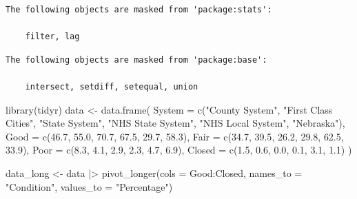 \documentclass[
  letterpaper,
  DIV=11,
  numbers=noendperiod]{scrreprt}
\newenvironment{Shaded}{\begin{snugshade}}{\end{snugshade}}
\newcommand{\AttributeTok}[1]{\textcolor[rgb]{0.40,0.45,0.13}{#1}}
\newcommand{\FloatTok}[1]{\textcolor[rgb]{0.68,0.00,0.00}{#1}}
\newcommand{\FunctionTok}[1]{\textcolor[rgb]{0.28,0.35,0.67}{#1}}
\newcommand{\NormalTok}[1]{\textcolor[rgb]{0.00,0.23,0.31}{#1}}
\newcommand{\OtherTok}[1]{\textcolor[rgb]{0.00,0.23,0.31}{#1}}
\newcommand{\SpecialCharTok}[1]{\textcolor[rgb]{0.37,0.37,0.37}{#1}}
\newcommand{\StringTok}[1]{\textcolor[rgb]{0.13,0.47,0.30}{#1}}
\begin{document}
\begin{verbatim}
The following objects are masked from 'package:stats':

    filter, lag
\end{verbatim}

\begin{verbatim}
The following objects are masked from 'package:base':

    intersect, setdiff, setequal, union
\end{verbatim}

\begin{Shaded}
\begin{Highlighting}[]
\FunctionTok{library}\NormalTok{(tidyr)}
\NormalTok{data }\OtherTok{\textless{}{-}} \FunctionTok{data.frame}\NormalTok{(}
  \AttributeTok{System =} \FunctionTok{c}\NormalTok{(}\StringTok{"County System"}\NormalTok{, }\StringTok{"First Class Cities"}\NormalTok{, }\StringTok{"State System"}\NormalTok{, }\StringTok{"NHS State System"}\NormalTok{, }
             \StringTok{"NHS Local System"}\NormalTok{, }\StringTok{"Nebraska"}\NormalTok{),}
  \AttributeTok{Good =} \FunctionTok{c}\NormalTok{(}\FloatTok{46.7}\NormalTok{, }\FloatTok{55.0}\NormalTok{, }\FloatTok{70.7}\NormalTok{, }\FloatTok{67.5}\NormalTok{, }\FloatTok{29.7}\NormalTok{, }\FloatTok{58.3}\NormalTok{),}
  \AttributeTok{Fair =} \FunctionTok{c}\NormalTok{(}\FloatTok{34.7}\NormalTok{, }\FloatTok{39.5}\NormalTok{, }\FloatTok{26.2}\NormalTok{, }\FloatTok{29.8}\NormalTok{, }\FloatTok{62.5}\NormalTok{, }\FloatTok{33.9}\NormalTok{),}
  \AttributeTok{Poor =} \FunctionTok{c}\NormalTok{(}\FloatTok{8.3}\NormalTok{, }\FloatTok{4.1}\NormalTok{, }\FloatTok{2.9}\NormalTok{, }\FloatTok{2.3}\NormalTok{, }\FloatTok{4.7}\NormalTok{, }\FloatTok{6.9}\NormalTok{),}
  \AttributeTok{Closed =} \FunctionTok{c}\NormalTok{(}\FloatTok{1.5}\NormalTok{, }\FloatTok{0.6}\NormalTok{, }\FloatTok{0.0}\NormalTok{, }\FloatTok{0.1}\NormalTok{, }\FloatTok{3.1}\NormalTok{, }\FloatTok{1.1}\NormalTok{)}
\NormalTok{)}

\NormalTok{data\_long }\OtherTok{\textless{}{-}}\NormalTok{ data }\SpecialCharTok{|\textgreater{}}
  \FunctionTok{pivot\_longer}\NormalTok{(}\AttributeTok{cols =}\NormalTok{ Good}\SpecialCharTok{:}\NormalTok{Closed, }\AttributeTok{names\_to =} \StringTok{"Condition"}\NormalTok{, }\AttributeTok{values\_to =} \StringTok{"Percentage"}\NormalTok{)}


\end{Highlighting}
\end{Shaded}
\end{document}
